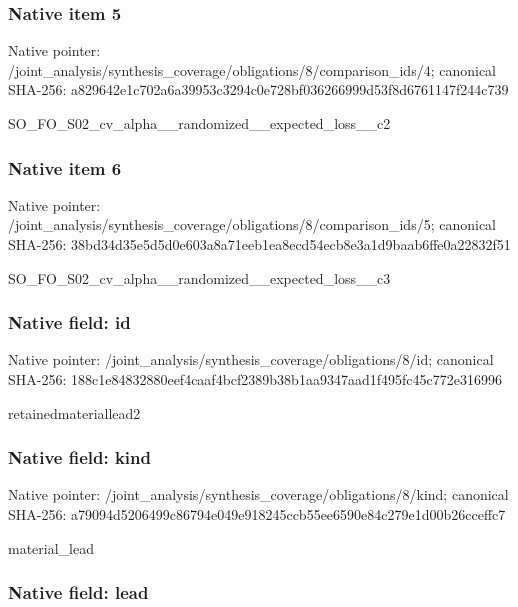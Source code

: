 \documentclass[10pt,a4paper]{article}
\begin{document}
\subsubsection{Native item 5}


Native pointer: /joint\_analysis/synthesi\allowbreak{}s\_coverage/obligations/8\allowbreak{}/comparison\_ids/4; canonical SHA-256: a829642e1c702a6a39953c32\allowbreak{}94c0e728bf036266999d53f8\allowbreak{}d6761147f244c739


SO\_FO\_S02\_cv\_alpha\_\_rand\allowbreak{}omized\_\_expected\_loss\_\_c\allowbreak{}2


\subsubsection{Native item 6}


Native pointer: /joint\_analysis/synthesi\allowbreak{}s\_coverage/obligations/8\allowbreak{}/comparison\_ids/5; canonical SHA-256: 38bd34d35e5d5d0e603a8a71\allowbreak{}eeb1ea8ecd54ecb8e3a1d9ba\allowbreak{}ab6ffe0a22832f51


SO\_FO\_S02\_cv\_alpha\_\_rand\allowbreak{}omized\_\_expected\_loss\_\_c\allowbreak{}3


\subsubsection{Native field: id}


Native pointer: /joint\_analysis/synthesi\allowbreak{}s\_coverage/obligations/8\allowbreak{}/id; canonical SHA-256: 188c1e84832880eef4caaf4b\allowbreak{}cf2389b38b1aa9347aad1f49\allowbreak{}5fc45c772e316996


retainedmateriallead2


\subsubsection{Native field: kind}


Native pointer: /joint\_analysis/synthesi\allowbreak{}s\_coverage/obligations/8\allowbreak{}/kind; canonical SHA-256: a79094d5206499c86794e049\allowbreak{}e918245ccb55ee6590e84c27\allowbreak{}9e1d00b26cceffc7


material\_lead


\subsubsection{Native field: lead}
\end{document}
